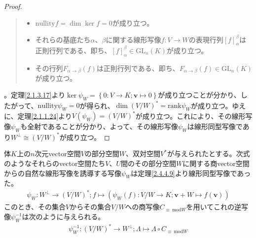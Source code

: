 \documentclass[dvipdfmx]{jsarticle}
\begin{document}
\begin{proof}
{\begin{quote}
\begin{itemize}
  \item
    $\mathrm{nullity}f = \dim{\ker f} = 0$が成り立つ。
  \item
    それらの基底たち$\alpha$、$\beta$に関する線形写像$f:V \rightarrow W$の表現行列$[ f]^{\beta}_{\alpha}$は正則行列である、即ち、$[ f]^{\beta}_{\alpha} \in {\mathrm{GL}}_{n}(K)$が成り立つ。
  \item
    その行列$F_{\alpha \rightarrow \beta}(f)$は正則行列である、即ち、$F_{\alpha \rightarrow \beta}(f) \in {\mathrm{GL}}_{n}(K)$が成り立つ。
  \end{itemize}
\end{quote}
}。定理\ref{2.1.3.17}より$\ker\psi_{W} = \left\{ 0:V \rightarrow K;\mathbf{v} \mapsto 0 \right\}$が成り立つことが分かり、したがって、$\mathrm{nullity} \psi_{W} = 0$が得られ、$\dim\left( {V}/{W} \right)^{*} = \mathrm{rank} \psi_{W}$が成り立つ。ゆえに、定理\ref{2.1.1.24}より$V\left( \psi_{W} \right) = \left( {V}/{W} \right)^{*}$が成り立つ。これにより、その線形写像$\psi_{W}$も全射であることが分かり、よって、その線形写像$\psi_{W}$は線形同型写像であり$W^{\bot} \cong \left( {V}/{W} \right)^{*}$が成り立つ。
\end{proof}
\begin{thm}\label{2.4.4.10}
体$K$上の$n$次元vector空間$V$の部分空間$W$、双対空間$V^{*}$が与えられたとする。次式のようなそれらのvector空間たち$V$、$U$間のその部分空間$W$に関する商vector空間からの自然な線形写像を誘導する写像$\psi_{W}$は定理\ref{2.4.4.9}より線形同型写像であった。
\begin{align*}
\psi_{W}:W^{\bot} \rightarrow \left( {V}/{W} \right)^{*};f \mapsto \left( \psi_{W}(f):{V}/{W} \rightarrow K;\mathbf{v} + W \mapsto f\left( \mathbf{v} \right) \right)
\end{align*}
このとき、その集合$V$からその集合${V}/{W}$への商写像$C_{\equiv \ \mathrm{mod}W}$を用いてこれの逆写像$\psi_{W}^{- 1}$は次のように与えられる。
\begin{align*}
\psi_{W}^{- 1}:\left( {V}/{W} \right)^{*} \rightarrow W^{\bot};\varLambda \mapsto \varLambda \circ C_{\equiv \ \mathrm{mod}W}
\end{align*}
\end{thm}
\end{document}

